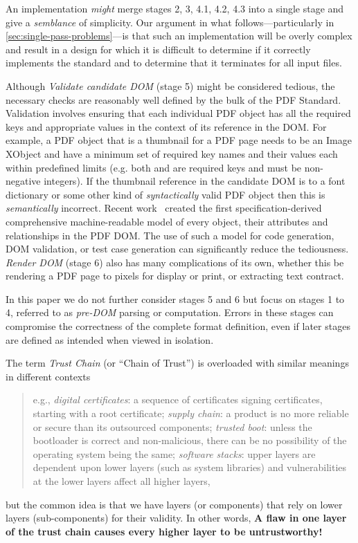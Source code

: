 An implementation \emph{might} merge stages 2, 3, 4.1, 4.2, 4.3 into
a single stage and give a \emph{semblance} of simplicity.
%
Our argument in what follows---particularly in
\cref{sec:single-pass-problems}---is
that such an implementation will be overly
complex and result in a design for which it is difficult
to determine if it correctly implements the standard
and to determine that it terminates for all input files.

Although \emph{Validate candidate DOM} (stage 5) might be considered tedious, the necessary checks are 
reasonably well defined by the bulk of the PDF Standard. Validation involves ensuring that each 
individual PDF object has all the required keys and appropriate values in the context of its reference in the DOM.
For example, a PDF object that is a thumbnail for a PDF page needs to be an Image XObject and have a 
minimum set of required key names and their values each within predefined limits (e.g. both
 and  are required keys and must be non-negative integers). If the 
thumbnail reference in the candidate DOM is to a font dictionary or some other kind of
\emph{syntactically} valid PDF object then this is \emph{semantically} incorrect. Recent work~
\cite{peterwyattArlingtonPDFModel2021} created the first specification-derived comprehensive
machine-readable model of every object, their attributes and relationships in the PDF DOM. The use
of such a model for code generation, DOM validation, or test case generation can significantly reduce the tediousness.
\emph{Render DOM} (stage 6) also has many complications of its own,
whether this be rendering a PDF
page to pixels for display or print, or extracting text contract.

In this paper we do not further consider stages 5 and 6 but
focus on stages 1 to 4, referred to as \emph{pre-DOM} parsing or computation.
%
Errors in these stages can compromise the correctness of the complete format
definition, even if later stages are defined as intended when viewed in
isolation.


The term \emph{Trust Chain} (or ``Chain of Trust'') is
overloaded with similar meanings in different contexts
\begin{quote}
e.g.,
\emph{digital certificates}: a sequence of certificates signing certificates,
starting with a root certificate;
\emph{supply chain}: a product is no more reliable or secure than its
outsourced components;
\emph{trusted boot}: unless the bootloader is correct and non-malicious,
there can be no possibility of the operating system being the same;
\emph{software stacks}: upper layers are dependent upon lower layers (such as
system libraries) and vulnerabilities at the lower layers affect all higher
layers,
\end{quote}
but the common idea is that we have layers (or components)
that rely on lower layers (sub-components) for their validity.
In other words,
{\bf{A flaw in one layer of the trust chain
     causes every higher layer to be untrustworthy!}}

